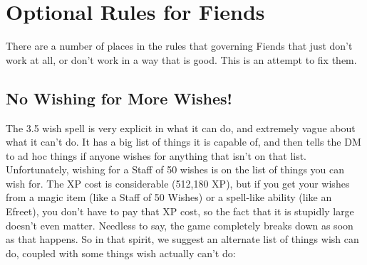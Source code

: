 
\chapter{Optional Rules for Fiends}

There are a number of places in the rules that governing Fiends that just don't work at all, or don't work in a way that is good. This is an attempt to fix them.

\section{No Wishing for More Wishes!}
The 3.5 wish spell is very explicit in what it can do, and extremely vague about what it can't do. It has a big list of things it is capable of, and then tells the DM to ad hoc things if anyone wishes for anything that isn't on that list. Unfortunately, wishing for a Staff of 50 wishes is on the list of things you can wish for. The XP cost is considerable (512,180 XP), but if you get your wishes from a magic item (like a Staff of 50 Wishes) or a spell-like ability (like an Efreet), you don't have to pay that XP cost, so the fact that it is stupidly large doesn't even matter. Needless to say, the game completely breaks down as soon as that happens. So in that spirit, we suggest an alternate list of things wish can do, coupled with some things wish actually can't do:

